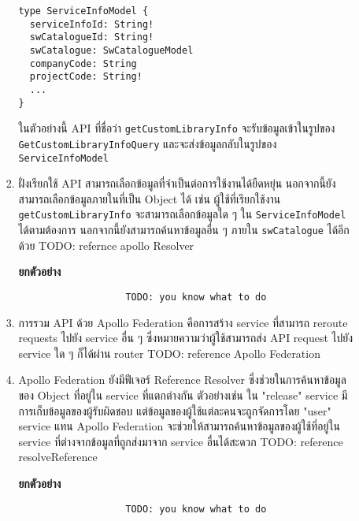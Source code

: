 \begin{enumerate}
\begin{enumerate}
\begin{enumerate}
\begin{center}
\begin{lstlisting}
type ServiceInfoModel {
  serviceInfoId: String!
  swCatalogueId: String!
  swCatalogue: SwCatalogueModel
  companyCode: String
  projectCode: String!
  ...
}
                \end{lstlisting}
            \end{center}
            ในตัวอย่างนี้ API ที่ชื่อว่า {\tt getCustomLibraryInfo} จะรับข้อมูลเข้าในรูปของ {\tt GetCustomLibraryInfoQuery} และจะส่งข้อมูลกลับในรูปของ {\tt ServiceInfoModel}

            \item ฝั่งเรียกใช้ API สามารถเลือกข้อมูลที่จำเป็นต่อการใช้งานได้ยืดหยุ่น นอกจากนี้ยังสามารถเลือกข้อมูลภายในที่เป็น Object ได้ เช่น ผู้ใช้ที่เรียกใช้งาน \texttt{getCustomLibraryInfo} จะสามารถเลือกข้อมูลใด ๆ ใน \texttt{ServiceInfoModel} ได้ตามต้องการ นอกจากนี้ยังสามารถค้นหาข้อมูลอื่น ๆ ภายใน \texttt{swCatalogue} ได้อีกด้วย TODO: refernce apollo Resolver
            
            \textbf{ยกตัวอย่าง}
            \begin{center}                
               \begin{lstlisting}
                   TODO: you know what to do
               \end{lstlisting}
           \end{center}
           
           \item การรวม API ด้วย Apollo Federation คือการสร้าง service ที่สามารถ reroute requests ไปยัง service อื่น ๆ ซึ่งหมายความว่าผู้ใช้สามารถส่ง API request ไปยัง service ใด ๆ ก็ได้ผ่าน router TODO: reference Apollo Federation

           \item Apollo Federation ยังมีฟีเจอร์ Reference Resolver ซึ่งช่วยในการค้นหาข้อมูลของ Object ที่อยู่ใน service ที่แตกต่างกัน ตัวอย่างเช่น ใน "release" service มีการเก็บข้อมูลของผู้รับผิดชอบ แต่ข้อมูลของผู้ใช้แต่ละคนจะถูกจัดการโดย "user" service แทน Apollo Federation จะช่วยให้สามารถค้นหาข้อมูลของผู้ใช้ที่อยู่ใน service ที่ต่างจากข้อมูลที่ถูกส่งมาจาก service อื่นได้สะดวก TODO: reference resolveReference
           
           \textbf{ยกตัวอย่าง}
           \begin{center}                
               \begin{lstlisting}
                   TODO: you know what to do
               \end{lstlisting}
           \end{center}


\end{enumerate}
\end{enumerate}
\end{enumerate}
